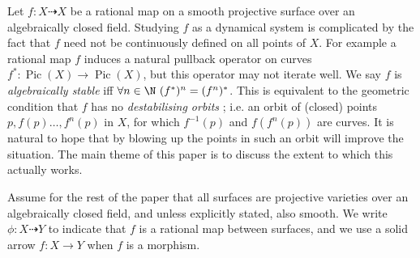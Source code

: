 \documentclass[11pt, final]{amsart}
\newcommand{\dashto}{\dashrightarrow}
\newcommand{\emp}{\emptyset}
\DeclareMathOperator{\Pic}{Pic}
\begin{document}

Let $f: X \dashto X$ be a rational map on a smooth projective surface over an algebraically closed field. Studying $f$ as a dynamical system is complicated by the fact that $f$ need not be continuously defined on all points of $X$. For example a rational map $f$ induces a natural pullback operator on curves $f^* : \Pic(X) \to \Pic(X)$, but this operator may not iterate well. We say $f$ is \emph{algebraically stable} iff $\forall n \in \N\ (f^*)^n = (f^n)^*$. This is equivalent to the geometric condition that $f$ has no \emph{destabilising orbits} \cite{DF}; i.e. an orbit of (closed) points $p, f(p)\dots, f^n(p)$ in $X$, for which $f^{-1}(p)$ and $f(f^n(p))$ are curves. It is natural to hope that by blowing up the points in such an orbit will improve the situation. The main theme of this paper is to discuss the extent to which this actually works.


Assume for the rest of the paper that all surfaces are projective varieties over an algebraically closed field, and unless explicitly stated, also smooth. We write $\phi : X \dashto Y$ to indicate that $f$ is a rational map between surfaces, and we use a solid arrow $f : X \to Y$ when $f$ is a morphism.
\end{document}
